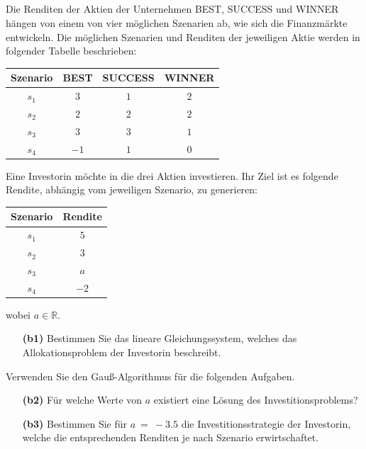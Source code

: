 \subsection*{}
Die Renditen der Aktien der Unternehmen BEST, SUCCESS und WINNER hängen von einem von vier möglichen Szenarien ab, wie sich die Finanzmärkte entwickeln. Die möglichen Szenarien und Renditen der jeweiligen Aktie werden in folgender Tabelle beschrieben:
\begin{table}[H]
	\centering
	\begin{tabular}{c c c c}
		\hline
		Szenario & BEST  &  SUCCESS &  WINNER \\ 
		\hline
		$ s_1 $ & $ 3 $ & $ 1 $ & $ 2 $  \\ 
		$ s_2 $ & $ 2 $ & $ 2 $ & $ 2 $ \\
		$ s_3 $ & $ 3 $ & $ 3 $ & $ 1 $ \\
		$ s_4 $ & $ -1 $ & $ 1 $ & $ 0 $\\
		\hline
	\end{tabular}%
\end{table}
Eine Investorin möchte in die drei Aktien investieren. Ihr Ziel ist es folgende Rendite, abhängig vom jeweiligen Szenario, zu generieren:
\begin{table}[H]
	\centering
	\begin{tabular}{c c}
		\hline
		Szenario & Rendite  \\
		\hline
		$ s_1 $ & $ 5 $ \\ 
		$ s_2 $ & $ 3 $  \\
		$ s_3 $ & $ a $  \\
		$ s_4 $ & $ -2 $ \\
		\hline
	\end{tabular}%
\end{table}
wobei $ a \in \mathbb{R} $.
\begin{enumerate}
	\item[\textbf{(b1)}]
	Bestimmen Sie das lineare Gleichungssystem, welches das Allokationsproblem der Investorin beschreibt.
\end{enumerate}
Verwenden Sie den Gauß-Algorithmus für die folgenden Aufgaben.
\begin{enumerate}
	\item[\textbf{(b2)}] 
	Für welche Werte von $ a $ existiert eine Lösung des Investitionsproblems?
	\item[\textbf{(b3)}]
	Bestimmen Sie für $ a \ = \ -3.5 $ die Investitionsstrategie der Investorin, welche die entsprechenden Renditen je nach Szenario erwirtschaftet.
\end{enumerate}
